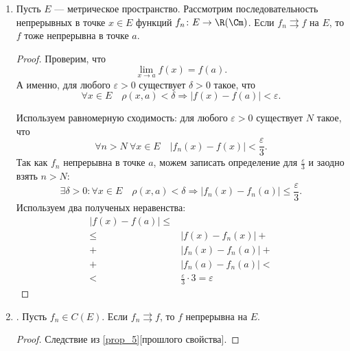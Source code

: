 \begin{prop}
\begin{enumerate}
\begin{proof}
\begin{description}
						Устремим $ m \to  \infty$. Тогда \[
							\lvert f_n(x) - f(x) \rvert \le  \varepsilon
						.\]
						По определению равномерной сходимости получаем, что $ f_n \rightrightarrows f$ на $ E$.
				\end{description}
			\end{proof}
		\item \label{prop_5} Пусть $ E$ --- метрическое пространство. Рассмотрим последовательность непрерывных в точке $ x \in E$ функций $ f_n \colon E \to \R(\Cm) $. Если $ f_n \rightrightarrows f$ на $ E$, то  $ f$ тоже непрерывна в точке  $ a$.
			\begin{proof}
				Проверим, что
				\[
					\lim_{x \to  a} f(x) = f(a)
				.\]
				А именно, для любого $ \varepsilon  > 0$ существует $ \delta > 0$ такое, что
				\[
					\forall x \in E \quad \rho(x, a) < \delta \Longrightarrow \lvert f(x) - f(a) \rvert  < \varepsilon
				.\]

				Используем равномерную сходимость: для любого  $ \varepsilon > 0$ существует $ N$ такое, что
				\[\label{eq:koshi_1}
					\forall n > N ~ \forall x \in E \quad \lvert f_n(x) - f(x) \rvert  < \frac{\varepsilon}{3}
				.\]
				Так как $ f_n$ непрерывна в точке $ a$, можем записать определение для  $ \frac{\varepsilon}{3}$ и заодно взять $ n > N$:
				\[
					\exists \delta >0 \colon \forall x \in  E \quad \rho(x, a) < \delta \Longrightarrow \lvert f_n(x) - f_n(a) \rvert \le \frac{\varepsilon}{3}
				.\]
				Используем два полученых неравенства:
				\begin{align*}
					\lvert f(x) - f(a) \rvert \le  & \\
					\le  & \lvert f(x) - f_n(x) \rvert + \\
					+ & \lvert f_n(x) - f_n(a) \rvert + \\
					+ & \lvert f_n(a) - f_n(a) \rvert < \\
					< & \frac{\varepsilon}{3} \cdot  3 = \varepsilon
				\end{align*}
			\end{proof}

		\item {}. Пусть $ f_n \in C(E)$. Если $ f_n \rightrightarrows f$, то $ f$ непрерывна на $ E$.
			\begin{proof}
				Следствие из \ref{prop_5}[прошлого свойства].
			\end{proof}
	\end{enumerate}
\end{prop}

\fontAwesomeSymbol{\faSlack}

